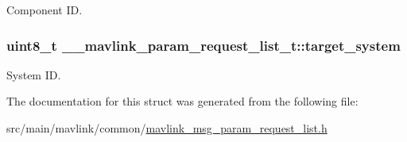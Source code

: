 Component I\+D. 

\hypertarget{struct____mavlink__param__request__list__t_aae3ba45d3ff75c3603ec6bf4eb58b244}{
\subsubsection[{target\+\_\+system}]{\setlength{\rightskip}{0pt plus 5cm}uint8\+\_\+t \+\_\+\+\_\+mavlink\+\_\+param\+\_\+request\+\_\+list\+\_\+t\+::target\+\_\+system}}\label{struct____mavlink__param__request__list__t_aae3ba45d3ff75c3603ec6bf4eb58b244}


System I\+D. 



The documentation for this struct was generated from the following file\+:\begin{DoxyCompactItemize}
\item 
src/main/mavlink/common/\hyperlink{mavlink__msg__param__request__list_8h}{mavlink\+\_\+msg\+\_\+param\+\_\+request\+\_\+list.\+h}\end{DoxyCompactItemize}
